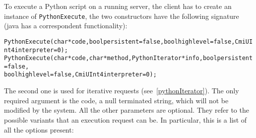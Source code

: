 \label{pythonExecute}

To execute a Python script on a running server, the client has to create an
instance of \texttt{PythonExecute}, the two constructors have the following
signature (java has a correspondent functionality):

\begin{alltt}
PythonExecute(char *code, bool persistent=false, bool highlevel=false, CmiUInt4 interpreter=0);
PythonExecute(char *code, char *method, PythonIterator *info, bool persistent=false,
              bool highlevel=false, CmiUInt4 interpreter=0);
\end{alltt}

The second one is used for iterative requests (see~\ref{pythonIterator}). The
only required argument is the code, a null terminated string, which will not be
modified by the system. All the other parameters are optional. They refer to the
possible variants that an execution request can be. In particular, this is a
list of all the options present:

